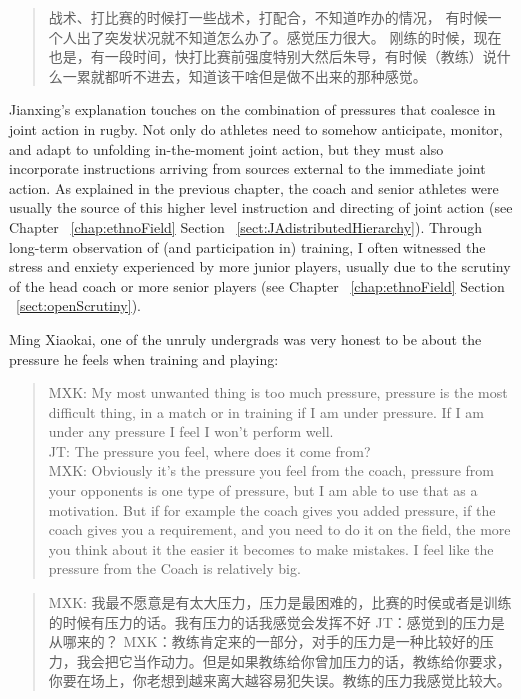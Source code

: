 \begin{CJK}{UTF8}{gbsn}
    \begin{quote}
      战术、打比赛的时候打一些战术，打配合，不知道咋办的情况， 有时候一个人出了突发状况就不知道怎么办了。感觉压力很大。 刚练的时候，现在也是，有一段时间，快打比赛前强度特别大然后朱导，有时候（教练）说什么一累就都听不进去，知道该干啥但是做不出来的那种感觉。
    \end{quote}

Jianxing's explanation touches on the combination of pressures that coalesce in joint action in rugby.  Not only do athletes need to somehow anticipate, monitor, and adapt to unfolding in-the-moment joint action, but they must also incorporate instructions arriving from sources external to the immediate joint action.  As explained in the previous chapter, the coach and senior athletes were usually the source of this higher level instruction and directing of joint action (see Chapter ~\ref{chap:ethnoField} Section ~\ref{sect:JAdistributedHierarchy}).  Through long-term observation of (and participation in) training, I often witnessed the stress and enxiety experienced by more junior players, usually due to the scrutiny of the head coach or more senior players (see Chapter ~\ref{chap:ethnoField} Section ~\ref{sect:openScrutiny}).

Ming Xiaokai, one of the unruly undergrads was very honest to be about the pressure he feels when training and playing:

    \begin{quote}
      MXK: My most unwanted thing is too much pressure, pressure is the most difficult thing, in a match or in training if I am under pressure.  If I am under any pressure I feel I won’t perform well. \\
      JT: The pressure you feel, where does it come from? \\
      MXK: Obviously it's the pressure you feel from the coach, pressure from your opponents is one type of pressure, but I am able to use that as a motivation. But if for example the coach gives you added pressure, if the coach gives you a requirement, and you need to do it on the field, the more you think about it the easier it becomes to make mistakes.  I feel like the pressure from the Coach is relatively big.
    \end{quote}

    \begin{quote}
      MXK: 我最不愿意是有太大压力，压力是最困难的，比赛的时侯或者是训练的时候有压力的话。我有压力的话我感觉会发挥不好
      JT：感觉到的压力是从哪来的？
      MXK：教练肯定来的一部分，对手的压力是一种比较好的压力，我会把它当作动力。但是如果教练给你曾加压力的话，教练给你要求，你要在场上，你老想到越来离大越容易犯失误。教练的压力我感觉比较大。
    \end{quote}


\end{CJK}

